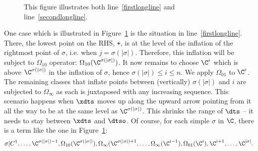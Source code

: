 \begin{figure}[ht]
  \centering
  \caption{This figure illustrates both line~\eqref{firstlongline} and line~\eqref{secondlongline}.}
  \label{fig:omega11}
\end{figure}

One case which is illustrated in Figure~\ref{fig:omega11} is the situation in line~\eqref{firstlongline}. There, the lowest point on the RHS, \texttt{+}, is at the level of the inflation of the rightmost point of $\sigma$, i.e. when $j = \sigma(|\sigma|)$. Therefore, this inflation will be subject to $\Omega_{10}$ operator: $\Omega_{10}(\C^{\sigma(|\sigma|)})$. It now remains to choose $\C^i$ which is above $\C^{\sigma(|\sigma|)}$ in the inflation of $\sigma$, hence $\sigma(|\sigma|) \leq i \leq n$. We apply $\Omega_{01}$ to $\C^i$. The remaining classes that inflate points between (vertically) $\sigma(|\sigma|)$ and $i$ are subjected to $\Omega_\infty$ as each is juxtaposed with any increasing sequence. This scenario happens when $\xdts$ moves up along the upward arrow pointing from it all the way to be at the same level as $\C^{\sigma(|\sigma|)}$. This shrinks the range of $\dts$ -- it needs to stay between $\xdts$ and $\dtso$. Of course, for each simple $\sigma$ in $\C$, there is a term like the one in Figure~\ref{fig:omega11}: $$\sigma\vert{C^1,\ldots,\C^{\sigma(|\sigma|)-1},\Omega_{10}(\C^{\sigma(|\sigma|)}), \Omega_\infty(\C^{\sigma(|\sigma|)+1},\ldots,\Omega_\infty(\C^{i-1}),\Omega_{01}(\C^i),\C^{i+1},\ldots,\C^{|\sigma|}}.$$

